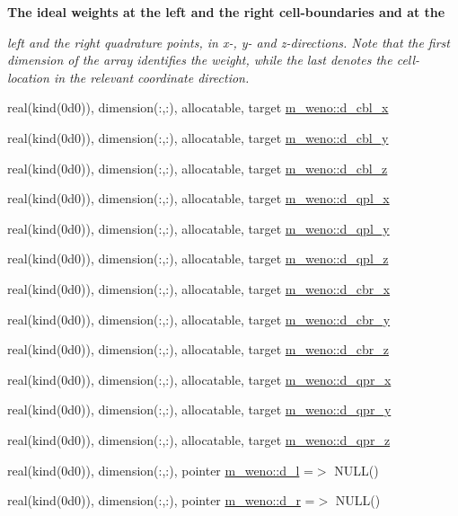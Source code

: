 \begin{Indent}\textbf{ The ideal weights at the left and the right cell-\/boundaries and at the}\par
{\em left and the right quadrature points, in x-\/, y-\/ and z-\/directions. Note that the first dimension of the array identifies the weight, while the last denotes the cell-\/location in the relevant coordinate direction. }\begin{DoxyCompactItemize}
\item 
real(kind(0d0)), dimension(\+:,\+:), allocatable, target \hyperlink{namespacem__weno_a64f585ebbc4e1bdaa629668e6dcc1c93}{m\+\_\+weno\+::d\+\_\+cbl\+\_\+x}
\item 
real(kind(0d0)), dimension(\+:,\+:), allocatable, target \hyperlink{namespacem__weno_a125fdee7148fefc8b5e6d35daece70d5}{m\+\_\+weno\+::d\+\_\+cbl\+\_\+y}
\item 
real(kind(0d0)), dimension(\+:,\+:), allocatable, target \hyperlink{namespacem__weno_aa79c790927be06b0b135c5d6e2a745af}{m\+\_\+weno\+::d\+\_\+cbl\+\_\+z}
\item 
real(kind(0d0)), dimension(\+:,\+:), allocatable, target \hyperlink{namespacem__weno_abbcb8241757105e94347691a4b578e18}{m\+\_\+weno\+::d\+\_\+qpl\+\_\+x}
\item 
real(kind(0d0)), dimension(\+:,\+:), allocatable, target \hyperlink{namespacem__weno_a041d103130713b7b3e8669c46b6d7ab0}{m\+\_\+weno\+::d\+\_\+qpl\+\_\+y}
\item 
real(kind(0d0)), dimension(\+:,\+:), allocatable, target \hyperlink{namespacem__weno_a058a869c6fa80036a080e4a2b28bfd19}{m\+\_\+weno\+::d\+\_\+qpl\+\_\+z}
\item 
real(kind(0d0)), dimension(\+:,\+:), allocatable, target \hyperlink{namespacem__weno_a91ff94c189407ac68a278d95054d86b7}{m\+\_\+weno\+::d\+\_\+cbr\+\_\+x}
\item 
real(kind(0d0)), dimension(\+:,\+:), allocatable, target \hyperlink{namespacem__weno_a4ba1bee6ea194265fb96686ee57c877c}{m\+\_\+weno\+::d\+\_\+cbr\+\_\+y}
\item 
real(kind(0d0)), dimension(\+:,\+:), allocatable, target \hyperlink{namespacem__weno_a02d6127ab8eaea07640ccfcdc516e5c4}{m\+\_\+weno\+::d\+\_\+cbr\+\_\+z}
\item 
real(kind(0d0)), dimension(\+:,\+:), allocatable, target \hyperlink{namespacem__weno_af7a633ce21fa6828a11c4594abccbd61}{m\+\_\+weno\+::d\+\_\+qpr\+\_\+x}
\item 
real(kind(0d0)), dimension(\+:,\+:), allocatable, target \hyperlink{namespacem__weno_a705ea5ec335fcf839b93e6e42204b850}{m\+\_\+weno\+::d\+\_\+qpr\+\_\+y}
\item 
real(kind(0d0)), dimension(\+:,\+:), allocatable, target \hyperlink{namespacem__weno_ae1cbc7d2a0f6da59401e7a15dff4c2fc}{m\+\_\+weno\+::d\+\_\+qpr\+\_\+z}
\item 
real(kind(0d0)), dimension(\+:,\+:), pointer \hyperlink{namespacem__weno_ab020cbb64bcbdee4c70f6eee10d5d064}{m\+\_\+weno\+::d\+\_\+l} =$>$ N\+U\+LL()
\item 
real(kind(0d0)), dimension(\+:,\+:), pointer \hyperlink{namespacem__weno_a587c6a49c1eb9f3d35be2735a56edd01}{m\+\_\+weno\+::d\+\_\+r} =$>$ N\+U\+LL()
\end{DoxyCompactItemize}
\end{Indent}
